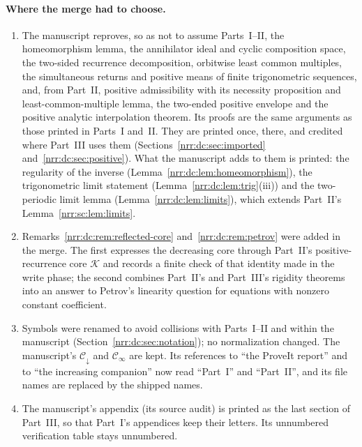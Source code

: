 \documentclass[11pt,letterpaper]{article}
\theoremstyle{definition}
\theoremstyle{remark}
\newcommand{\pcore}{\mathcal K}
\begin{document}
\paragraph{Where the merge had to choose.}
\begin{enumerate}[label=\textnormal{(\alph*)},leftmargin=2.2em]
\item The manuscript reproves, so as not to assume Parts~I--II, the
homeomorphism lemma, the annihilator ideal and cyclic composition space, the
two-sided recurrence decomposition, orbitwise least common multiples, the
simultaneous returns and positive means of finite trigonometric sequences,
and, from Part~II, positive admissibility with its necessity proposition and
least-common-multiple lemma, the two-ended positive envelope and the positive
analytic interpolation theorem. Its proofs are the same arguments as those
printed in Parts~I and~II. They are printed once, there, and credited where
Part~III uses them (Sections~\ref{nrr:dc:sec:imported}
and~\ref{nrr:dc:sec:positive}). What the manuscript adds to them is printed:
the regularity of the inverse (Lemma~\ref{nrr:dc:lem:homeomorphism}), the
trigonometric limit statement (Lemma~\ref{nrr:dc:lem:trig}(iii)) and the
two-periodic limit lemma (Lemma~\ref{nrr:dc:lem:limits}), which extends
Part~II's Lemma~\ref{nrr:sc:lem:limits}.
\item Remarks~\ref{nrr:dc:rem:reflected-core} and~\ref{nrr:dc:rem:petrov}
were added in the merge. The first expresses the decreasing core through
Part~II's positive-recurrence core $\pcore$ and records a finite check of that
identity made in the write phase; the second combines Part~II's and
Part~III's rigidity theorems into an answer to Petrov's linearity question for
equations with nonzero constant coefficient.
\item Symbols were renamed to avoid collisions with Parts~I--II and within the
manuscript (Section~\ref{nrr:dc:sec:notation}); no normalization changed.
The manuscript's $\mathcal C_{\downarrow}$ and $\mathcal C_\infty$ are kept.
Its references to ``the ProveIt report'' and to ``the increasing companion''
now read ``Part~I'' and ``Part~II'', and its file names are replaced by the
shipped names.
\item The manuscript's appendix (its source audit) is printed as the last
section of Part~III, so that Part~I's appendices keep their letters. Its
unnumbered verification table stays unnumbered.
\end{enumerate}
\end{document}
